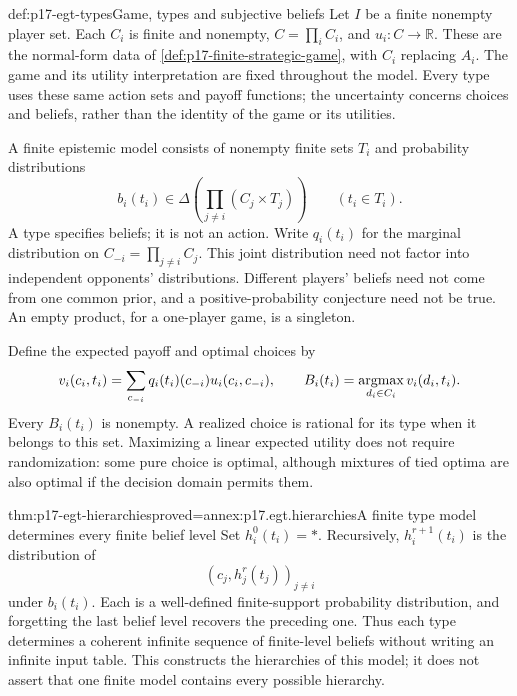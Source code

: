 \begin{hbdefinition}{def:p17-egt-types}{Game, types and subjective beliefs}
Let \(I\) be a finite nonempty player set. Each \(C_i\) is finite
and nonempty, \(C=\prod_i C_i\), and \(u_i:C\to\mathbb R\).
These are the normal-form data of
\cref{def:p17-finite-strategic-game}, with \(C_i\) replacing \(A_i\).
The game and its utility interpretation are fixed throughout the model.
Every type uses these same action sets and payoff functions; the
uncertainty concerns choices and beliefs, rather than the identity
of the game or its utilities.

A finite epistemic model consists of nonempty finite sets \(T_i\)
and probability distributions
\[
 b_i(t_i)\in\Delta\!\left(\prod_{j\ne i}(C_j\times T_j)\right)
 \qquad(t_i\in T_i).
\]
A type specifies beliefs; it is not an action. Write \(q_i(t_i)\)
for the marginal distribution on \(C_{-i}=\prod_{j\ne i}C_j\).
This joint distribution need not factor into independent opponents'
distributions. Different players' beliefs need not come from one
common prior, and a positive-probability conjecture need not be true.
An empty product, for a one-player game, is a singleton.

Define the expected payoff and optimal choices by
\[
 v_i(c_i,t_i)=\sum_{c_{-i}}q_i(t_i)(c_{-i})u_i(c_i,c_{-i}),
 \qquad
 B_i(t_i)=\mathop{\rm argmax}_{d_i\in C_i}v_i(d_i,t_i).
\]
Every \(B_i(t_i)\) is nonempty. A realized choice is rational for its
type when it belongs to this set. Maximizing a linear expected utility
does not require randomization: some pure choice is optimal, although
mixtures of tied optima are also optimal if the decision domain permits them.
\end{hbdefinition}

\begin{hbtheorem}{thm:p17-egt-hierarchies}{proved=annex:p17.egt.hierarchies}{A finite type model determines every finite belief level}
Set \(h_i^0(t_i)=*\). Recursively, \(h_i^{r+1}(t_i)\) is the
distribution of
\[
                  (c_j,h_j^r(t_j))_{j\ne i}
\]
under \(b_i(t_i)\). Each is a well-defined finite-support probability
distribution, and forgetting the last belief level recovers the
preceding one. Thus each type determines a coherent infinite sequence
of finite-level beliefs without writing an infinite input table.
This constructs the hierarchies of this model; it does not assert
that one finite model contains every possible hierarchy.
\end{hbtheorem}

